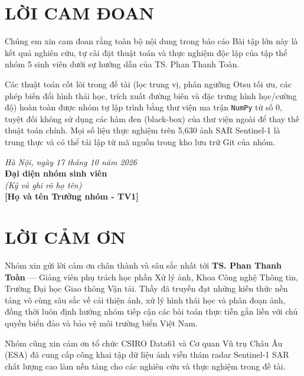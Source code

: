 \newpage
{}
\setcounter{page}{1}

\section*{LỜI CAM ĐOAN}
Chúng em xin cam đoan rằng toàn bộ nội dung trong báo cáo Bài tập lớn này là kết quả nghiên cứu, tự cài đặt thuật toán và thực nghiệm độc lập của tập thể nhóm 5 sinh viên dưới sự hướng dẫn của TS. Phan Thanh Toàn.

Các thuật toán cốt lõi trong đề tài (lọc trung vị, phân ngưỡng Otsu tối ưu, các phép biến đổi hình thái học, trích xuất đường biên và đặc trưng hình học/cường độ) hoàn toàn được nhóm tự lập trình bằng thư viện ma trận \texttt{NumPy} từ số 0, tuyệt đối không sử dụng các hàm đen (black-box) của thư viện ngoài để thay thế thuật toán chính. Mọi số liệu thực nghiệm trên 5,630 ảnh SAR Sentinel-1 là trung thực và có thể tái lập từ mã nguồn trong kho lưu trữ Git của nhóm.

\begin{flushright}
    \textit{Hà Nội, ngày 17 tháng 10 năm 2026}\\
    \textbf{Đại diện nhóm sinh viên}\\
    \textit{(Ký và ghi rõ họ tên)}\\[1.5cm]
    \textbf{[Họ và tên Trưởng nhóm - TV1]}
\end{flushright}

\newpage
\section*{LỜI CẢM ƠN}
Nhóm xin gửi lời cảm ơn chân thành và sâu sắc nhất tới \textbf{TS. Phan Thanh Toàn} --- Giảng viên phụ trách học phần Xử lý ảnh, Khoa Công nghệ Thông tin, Trường Đại học Giao thông Vận tải. Thầy đã truyền đạt những kiến thức nền tảng vô cùng sâu sắc về cải thiện ảnh, xử lý hình thái học và phân đoạn ảnh, đồng thời luôn định hướng nhóm tiếp cận các bài toán thực tiễn gắn liền với chủ quyền biển đảo và bảo vệ môi trường biển Việt Nam.

Nhóm cũng xin cảm ơn tổ chức CSIRO Data61 và Cơ quan Vũ trụ Châu Âu (ESA) đã cung cấp công khai tập dữ liệu ảnh viễn thám radar Sentinel-1 SAR chất lượng cao làm nền tảng cho các nghiên cứu và thực nghiệm trong đề tài.

